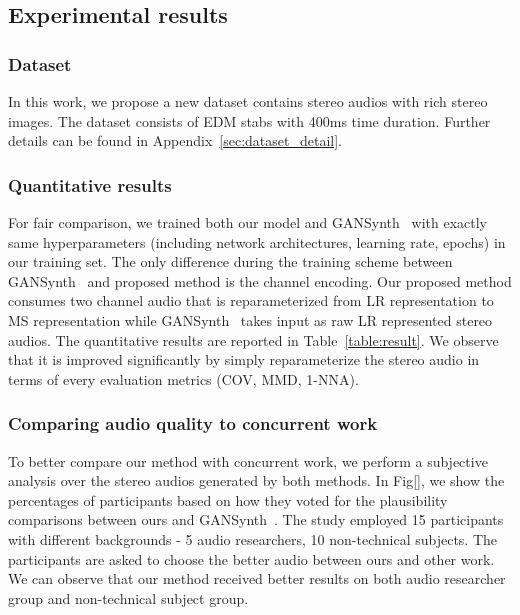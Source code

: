 \subsection{Experimental results}
\label{subsec:result}
\subsubsection{Dataset}
\label{subsubsec:dataset}
In this work, we propose a new dataset contains stereo audios with rich stereo images. The dataset consists of EDM stabs with 400ms time duration. Further details can be found in Appendix~\ref{sec:dataset_detail}. 

\subsubsection{Quantitative results}
\label{subsubsec:result}

For fair comparison, we trained both our model and GANSynth~\cite{gansynth} with exactly same hyperparameters (including network architectures, learning rate, epochs) in our training set. The only difference during the training scheme between GANSynth~\cite{gansynth} and proposed method is the channel encoding. Our proposed method consumes two channel audio that is reparameterized from LR representation to MS representation while GANSynth~\cite{gansynth} takes input as raw LR represented stereo audios. The quantitative results are reported in Table~\ref{table:result}. We observe that it is improved significantly by simply reparameterize the stereo audio in terms of every evaluation metrics (COV, MMD, 1-NNA).

\subsubsection{Comparing audio quality to concurrent work}
\label{subsubsec:audio_quality}

To better compare our method with concurrent work, we perform a subjective analysis over the stereo audios generated by both methods. In Fig[], we show the percentages of participants based on how they voted for the plausibility comparisons between ours and GANSynth~\cite{gansynth}. The study employed 15 participants with different backgrounds - 5 audio researchers, 10 non-technical subjects. The participants are asked to choose the better audio between ours and other work. We can observe that our method received better results on both audio researcher group and non-technical subject group.